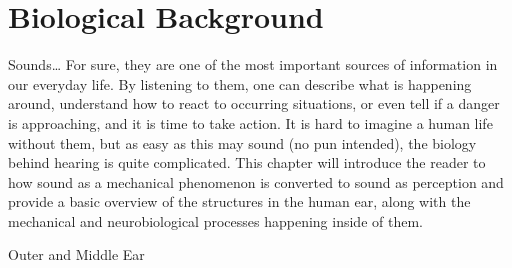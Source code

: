 \chapter{Biological Background}

Sounds… For sure, they are one of the most important sources of information in our everyday life. By listening to them, one can describe what is happening around, understand how to react to occurring situations, or even tell if a danger is approaching, and it is time to take action. It is hard to imagine a human life without them, but as easy as this may sound (no pun intended), the biology behind hearing is quite complicated. This chapter will introduce the reader to how sound as a mechanical phenomenon is converted to sound as perception and provide a basic overview of the structures in the human ear, along with the mechanical and neurobiological processes happening inside of them.


Outer and Middle Ear


